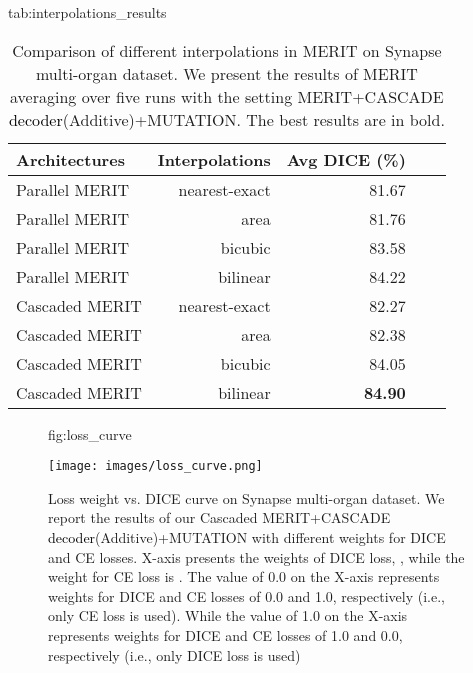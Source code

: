 \documentclass{midl}
\begin{document}
\begin{table*}[t]
\centering
\floatconts
{tab:interpolations_results}
{\caption{Comparison of different interpolations in MERIT on Synapse multi-organ dataset. We present the results of MERIT averaging over five runs with the setting MERIT+CASCADE \textcolor{black}{decoder}(Additive)+MUTATION. The best results are in bold.}} {{\vspace{-0.4cm}\begin{tabular}{lrrrr}
\toprule
Architectures    &  Interpolations    &   \multicolumn{1}{l}{Avg DICE (\%)} \\
\midrule
Parallel MERIT            &  nearest-exact            & 81.67  \\
Parallel MERIT           & area                            & 81.76   \\
Parallel MERIT            &  bicubic            & 83.58  \\
Parallel MERIT           & bilinear                            & 84.22   \\
\midrule
Cascaded MERIT         & nearest-exact                    & 82.27      \\
Cascaded MERIT        & area                     & 82.38   \\
Cascaded MERIT         & bicubic                    & 84.05      \\
Cascaded MERIT        & bilinear                     & \textbf{84.90}   \\
\bottomrule \end{tabular}}
}\end{table*}

\begin{figure}[t]\floatconts
  {fig:loss_curve}
  {\vspace{-0.7cm} \caption{Loss weight vs. DICE curve on Synapse multi-organ dataset. We report the results of our Cascaded MERIT+CASCADE \textcolor{black}{decoder}(Additive)+MUTATION with different weights for DICE and CE losses. X-axis presents the weights of DICE loss, , while the weight for CE loss is . The value of 0.0 on the X-axis represents weights for DICE and CE losses of 0.0 and 1.0, respectively (i.e., only CE loss is used). While the value of 1.0 on the X-axis represents weights for DICE and CE losses of 1.0 and 0.0, respectively (i.e., only DICE loss is used)}}
  {\texttt{[image: images/loss\_curve.png]}}
\end{figure}
\end{document}
